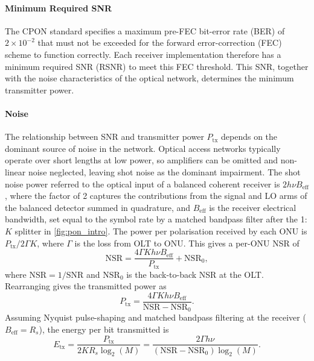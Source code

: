 \documentclass[12pt,a4paper]{report}
\begin{document}
\paragraph{Minimum Required SNR}
The CPON standard specifies a maximum pre-FEC bit-error rate (BER) of \(2\times10^{-2}\) that must not be exceeded for the forward error-correction (FEC) scheme to function correctly. Each receiver implementation therefore has a minimum required SNR (RSNR) to meet this FEC threshold. This SNR, together with the noise characteristics of the optical network, determines the minimum transmitter power.

\paragraph{Noise}
The relationship between SNR and transmitter power \(P_\mathrm{tx}\) depends on the dominant source of noise in the network. Optical access networks typically operate over short lengths at low power, so amplifiers can be omitted and non-linear noise neglected, leaving shot noise as the dominant impairment. The shot noise power referred to the optical input of a balanced coherent receiver is \(2h\nu B_\mathrm{eff}\), where the factor of 2 captures the contributions from the signal and LO arms of the balanced detector summed in quadrature, and \(B_\mathrm{eff}\) is the receiver electrical bandwidth, set equal to the symbol rate by a matched bandpass filter after the 1:\(K\) splitter in \cref{fig:pon_intro}. The power per polarisation received by each ONU is \(P_\mathrm{tx}/2\Gamma K\), where $\Gamma$ is the loss from OLT to ONU. This gives a per-ONU NSR of
\begin{equation}
    \mathrm{NSR} = \frac{4\Gamma K h\nu B_\mathrm{eff}}{P_\mathrm{tx}} + \mathrm{NSR}_0,
    \label{eq:snr_shot}
\end{equation}
where $\mathrm{NSR} = 1/\mathrm{SNR}$ and $\mathrm{NSR}_0$ is the back-to-back NSR at the OLT. Rearranging gives the transmitted power as
\begin{equation}
    P_\mathrm{tx} = \frac{4\Gamma Kh\nu B_\mathrm{eff}}{\mathrm{NSR} - \mathrm{NSR}_0}.
\end{equation}
Assuming Nyquist pulse-shaping and matched bandpass filtering at the receiver ($B_\mathrm{eff} = R_s$), the energy per bit transmitted is
\begin{equation}
    E_\mathrm{tx} = \frac{P_\mathrm{tx}}{2KR_s \log_2(M)} = \frac{2\Gamma h\nu}{(\mathrm{NSR} - \mathrm{NSR}_0)\log_2(M)}.
    \label{eq:tx_bit_energy}
\end{equation}
\end{document}
